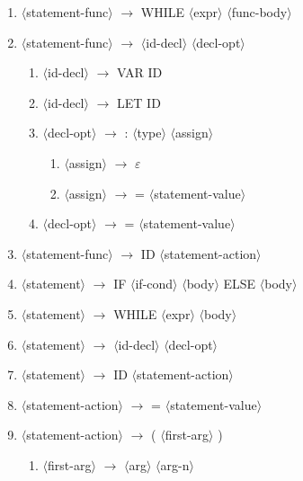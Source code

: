 \documentclass[a4paper]{article}
\newcommand{\red}[1]{{\color{red} #1}}
\begin{document}
\begin{enumerate}
\begin{enumerate}
    \end{enumerate}
    \item $\langle$statement-func$\rangle$ $\rightarrow$ \red{WHILE} $\langle$expr$\rangle$ $\langle$func-body$\rangle$
    \item $\langle$statement-func$\rangle$ $\rightarrow$ $\langle$id-decl$\rangle$ $\langle$decl-opt$\rangle$
    \begin{enumerate}
        \item $\langle$id-decl$\rangle$ $\rightarrow$ \red{VAR ID}
        \item $\langle$id-decl$\rangle$ $\rightarrow$ \red{LET ID}
        \item $\langle$decl-opt$\rangle$ $\rightarrow$ \red{:} $\langle$type$\rangle$ $\langle$assign$\rangle$
        \begin{enumerate}
            \item $\langle$assign$\rangle$ $\rightarrow$ \red{$\varepsilon$}
            \item $\langle$assign$\rangle$ $\rightarrow$ \red{=} $\langle$statement-value$\rangle$
        \end{enumerate}
        \item $\langle$decl-opt$\rangle$ $\rightarrow$ \red{=} $\langle$statement-value$\rangle$
    \end{enumerate}
    \item $\langle$statement-func$\rangle$ $\rightarrow$ \red{ID} $\langle$statement-action$\rangle$
    \item $\langle$statement$\rangle$ $\rightarrow$ \red{IF} $\langle$if-cond$\rangle$ $\langle$body$\rangle$ \red{ELSE} $\langle$body$\rangle$
    \item $\langle$statement$\rangle$ $\rightarrow$ \red{WHILE} $\langle$expr$\rangle$ $\langle$body$\rangle$
    \item $\langle$statement$\rangle$ $\rightarrow$ $\langle$id-decl$\rangle$ $\langle$decl-opt$\rangle$
    \item $\langle$statement$\rangle$ $\rightarrow$ \red{ID} $\langle$statement-action$\rangle$
    \item $\langle$statement-action$\rangle$ $\rightarrow$ = $\langle$statement-value$\rangle$
    \item $\langle$statement-action$\rangle$ $\rightarrow$ ( $\langle$first-arg$\rangle$ )
    \begin{enumerate}
        \item $\langle$first-arg$\rangle$ $\rightarrow$ $\langle$arg$\rangle$ $\langle$arg-n$\rangle$

\end{enumerate}
\end{enumerate}
\end{document}
